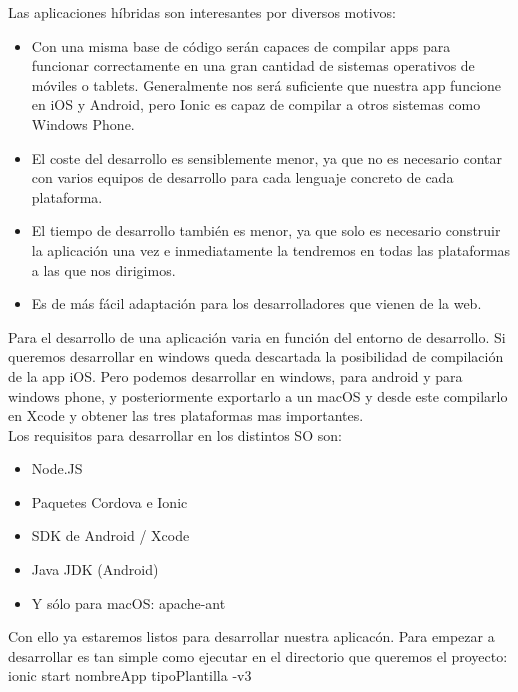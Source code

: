 \documentclass[a4paper, 11pt]{article}
\begin{document}
\begin{itemize}
            Las aplicaciones híbridas son interesantes por diversos motivos:
            \begin{itemize}
                \item{Con una misma base de código serán capaces de compilar apps
                para funcionar correctamente en una gran cantidad de sistemas
                operativos de móviles o tablets. Generalmente nos será suficiente
                que nuestra app funcione en iOS y Android, pero Ionic es capaz de
                compilar a otros sistemas como Windows Phone.}
                \item{El coste del desarrollo es sensiblemente menor, ya que no es
                necesario contar con varios equipos de desarrollo para cada lenguaje
                concreto de cada plataforma.}
                \item{El tiempo de desarrollo también es menor, ya que solo es
                necesario construir la aplicación una vez e inmediatamente la
                tendremos en todas las plataformas a las que nos dirigimos.}
                \item {Es de más fácil adaptación para los desarrolladores que
                vienen de la web.}
            \end{itemize}

            Para el desarrollo de una aplicación varia en función del entorno de
            desarrollo. Si queremos desarrollar en windows queda descartada la
            posibilidad de compilación de la app iOS. Pero podemos desarrollar en
            windows, para android y para windows phone, y posteriormente exportarlo
            a un macOS y desde este compilarlo en Xcode y obtener las tres
            plataformas mas importantes.\\

            Los requisitos para desarrollar en los distintos SO son:
            \begin{itemize}
                \item{Node.JS}
                \item{Paquetes Cordova e Ionic}
                \item{SDK de Android / Xcode}
                \item{Java JDK (Android)}
                \item{Y sólo para macOS: apache-ant}
            \end{itemize}

            Con ello ya estaremos listos para desarrollar nuestra aplicacón. Para
            empezar a desarrollar es tan simple como ejecutar en el directorio que
            queremos el proyecto: ionic start nombreApp tipoPlantilla -v3\\


\end{itemize}
\end{document}
